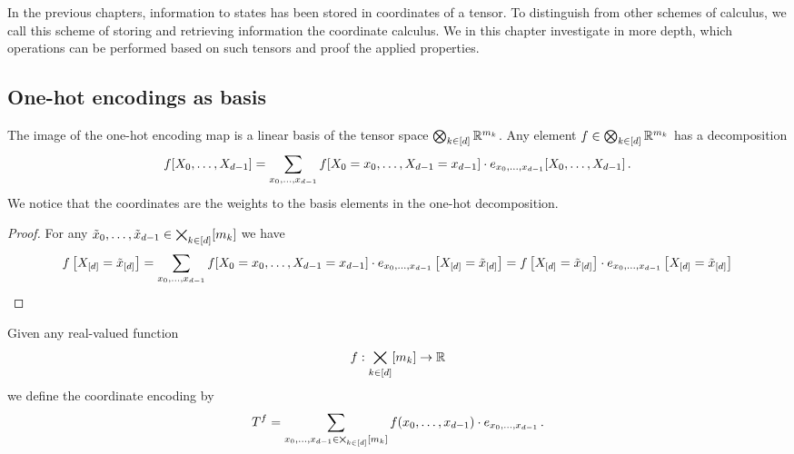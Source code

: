 \section{\chatextcoordinateCalculus} \label{cha:coordinateCalculus}

In the previous chapters, information to states has been stored in coordinates of a tensor.
To distinguish from other schemes of calculus, we call this scheme of storing and retrieving information the coordinate calculus.
We in this chapter investigate in more depth, which operations can be performed based on such tensors and proof the applied properties.



\subsection{One-hot encodings as basis}

\begin{lemma}\label{lem:tensorBasisDecomposition}
	The image of the one-hot encoding map is a linear basis of the tensor space $\bigotimes_{k\in[d]} \mathbb{R}^{m_{k}}$.
	Any element $f\in\bigotimes_{k\in[d]} \mathbb{R}^{m_{k}}$ has a decomposition 
		\[ f[X_{0},\ldots,X_{d-1}] = \sum_{x_{0},\ldots,x_{d-1}} f[X_{0}=x_{0},\ldots,X_{d-1}=x_{d-1}] \cdot e_{x_{0},\ldots,x_{d-1}}[X_{0},\ldots,X_{d-1}] \, . \]
	We notice that the coordinates are the weights to the basis elements in the one-hot decomposition.
\end{lemma}
\begin{proof}
	For any $\tilde{x}_{0},\ldots,\tilde{x}_{d-1}\in\bigtimes_{k\in[d]}[m_{k}]$ we have
		\[ f\left[X_{[d]}=\tilde{x}_{[d]}\right]
		= \sum_{x_{0},\ldots,x_{d-1}} f[X_{0}=x_{0},\ldots,X_{d-1}=x_{d-1}] \cdot e_{x_{0},\ldots,x_{d-1}}\left[X_{[d]}=\tilde{x}_{[d]}\right] 
		= f\left[X_{[d]}=\tilde{x}_{[d]}\right] \cdot e_{x_{0},\ldots,x_{d-1}}\left[X_{[d]}=\tilde{x}_{[d]}\right]   \]
\end{proof}


\begin{definition}
	Given any real-valued function 
		\[ f : \bigtimes_{k\in[d]}[m_{k}] \rightarrow \mathbb{R} \]
	we define the coordinate encoding by
		\[ T^{f} = \sum_{x_{0},\ldots,x_{d-1}\in\bigtimes_{k\in[d]}[m_{k}]} f(x_{0},\ldots,x_{d-1}) \cdot e_{x_{0},\ldots,x_{d-1}} \, . \]
\end{definition}


